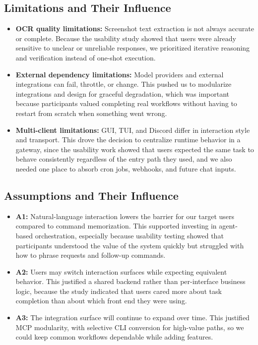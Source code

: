 \documentclass{article}
\begin{document}
\subsection{Limitations and Their Influence}

\begin{itemize}
	\item \textbf{OCR quality limitations:} Screenshot text extraction is not
	always accurate or complete. Because the usability study showed that users were
	already sensitive to unclear or unreliable responses, we prioritized iterative
	reasoning and verification instead of one-shot execution.
	\item \textbf{External dependency limitations:} Model providers and external
	integrations can fail, throttle, or change. This pushed us to modularize
	integrations and design for graceful degradation, which was important because
	participants valued completing real workflows without having to restart from
	scratch when something went wrong.
	\item \textbf{Multi-client limitations:} GUI, TUI, and Discord differ in
	interaction style and transport. This drove the decision to centralize runtime
	behavior in a gateway, since the usability work showed that users expected the
	same task to behave consistently regardless of the entry path they used, and
	we also needed one place to absorb cron jobs, webhooks, and future chat inputs.
\end{itemize}

\subsection{Assumptions and Their Influence}

\begin{itemize}
	\item \textbf{A1:} Natural-language interaction lowers the barrier for our
	target users compared to command memorization. This supported investing in
	agent-based orchestration, especially because usability testing showed that
	participants understood the value of the system quickly but struggled with how
	to phrase requests and follow-up commands.
	\item \textbf{A2:} Users may switch interaction surfaces while expecting
	equivalent behavior. This justified a shared backend rather than per-interface
	business logic, because the study indicated that users cared more about task
	completion than about which front end they were using.
	\item \textbf{A3:} The integration surface will continue to expand over time.
	This justified MCP modularity, with selective CLI conversion for high-value
	paths, so we could keep common workflows dependable while adding features.
\end{itemize}
\end{document}

